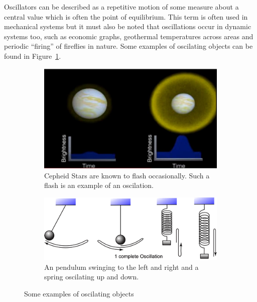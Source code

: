 \label{sec:intro}

Oscillators can be described as a repetitive motion of some measure about a central value which is often the point of equilibrium. This term is often used in mechanical systems but it must also be noted that oscillations occur in dynamic systems too, such as economic graphs, geothermal temperatures across areas and periodic ``firing'' of fireflies in nature. Some examples of oscilating objects can be found in Figure~\ref{fig:intro_samples}. 

\begin{figure}[h]
\centering
\begin{subfigure}{.4\textwidth}
  \centering
  \includegraphics[width=\textwidth]{imgs/cepheid}
  \caption{Cepheid Stars are known to flash occasionally. Such a flash is an example of an oscilation. }
\end{subfigure}%
\space\space\space
\begin{subfigure}{.5\textwidth}
  \centering
  \includegraphics[width=\textwidth]{imgs/oscillation}
  \caption{An pendulum swinging to the left and right and a spring oscilating up and down. }
\end{subfigure}
\caption{Some examples of oscilating objects}
\label{fig:intro_samples}
\end{figure}

